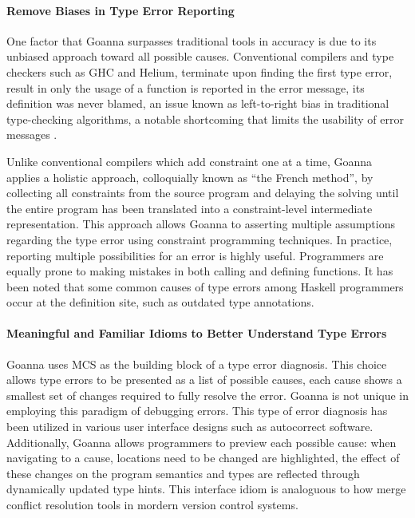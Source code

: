 \documentclass[pdflatex,sn-nature,Numbered]{sn-jnl}%
\begin{document}
\paragraph{Remove Biases in Type Error Reporting}

One factor that Goanna surpasses traditional tools in accuracy is due to its unbiased approach toward all possible causes. Conventional compilers and type checkers such as GHC and Helium, terminate upon finding the first type error, result in only the usage of a function is reported in the error message, its definition was never blamed, an issue known as left-to-right bias in traditional type-checking algorithms, a notable shortcoming that limits the usability of error messages \cite{McAdam2002-vb, Lee1998-fx, Chen2014-ev}. 

Unlike conventional compilers which add constraint one at a time, Goanna applies a holistic approach, colloquially known as ``the French method'', by collecting all constraints from the source program and delaying the solving until the entire program has been translated into a constraint-level intermediate representation. This approach allows Goanna to asserting multiple assumptions regarding the type error using constraint programming techniques. In practice, reporting multiple possibilities for an error is highly useful. Programmers are equally prone to making mistakes in both calling and defining functions. It has been noted that some common causes of type errors among Haskell programmers occur at the definition site, such as outdated type annotations.

\paragraph{Meaningful and Familiar Idioms to Better Understand Type Errors}

Goanna uses MCS as the building block of a type error diagnosis. This choice allows type errors to be presented as a list of possible causes, each cause shows a smallest set of changes required to fully resolve the error. Goanna is not unique in employing this paradigm of debugging errors. This type of error diagnosis has been utilized in various user interface designs such as autocorrect software. Additionally, Goanna allows programmers to preview each possible cause: when navigating to a cause, locations need to be changed are highlighted, the effect of these changes on the program semantics and types are reflected through dynamically updated type hints. This interface idiom is analoguous to how merge conflict resolution tools in mordern version control systems.
\end{document}
